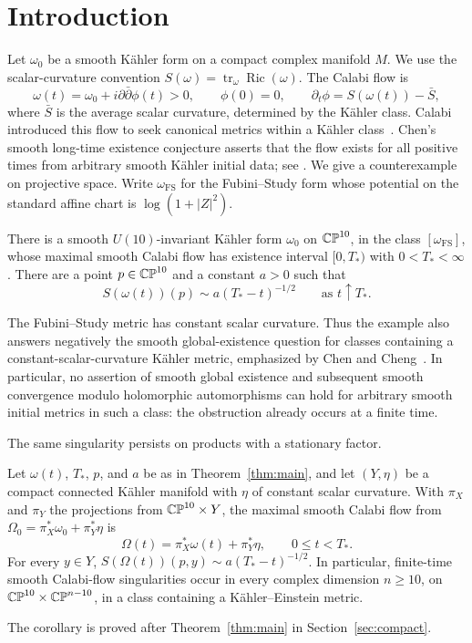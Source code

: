 \section{Introduction}\label{sec:introduction}
Let \(\omega_0\) be a smooth K\"ahler form on a compact complex manifold \(M\).
We use the scalar-curvature convention
\(S(\omega)=\operatorname{tr}_\omega\operatorname{Ric}(\omega)\).
The Calabi flow is
\begin{equation}\label{eq:calabi-flow}
 \omega(t)=\omega_0+i\partial\bar\partial\phi(t)>0,
 \qquad \phi(0)=0,\qquad
 \partial_t\phi=S(\omega(t))-\bar S,
\end{equation}
where \(\bar S\) is the average scalar curvature, determined by the K\"ahler class.
Calabi introduced this flow to seek canonical metrics within a K\"ahler
class~\cite{Calabi1982}. Chen's smooth long-time existence conjecture
asserts that the flow exists for all positive times from arbitrary smooth
K\"ahler initial data; see \cite[Conjecture~1.1]{HeZeng2021}.
We give a counterexample on projective space. Write
\(\omega_{\mathrm{FS}}\) for the Fubini--Study form whose potential
on the standard affine chart is \(\log(1+|Z|^2)\).

\begin{theorem}\label{thm:main}
There is a smooth \(U(10)\)-invariant K\"ahler form \(\omega_0\) on
\(\mathbb{CP}^{10}\), in the class \([\omega_{\mathrm{FS}}]\), whose maximal smooth
Calabi flow has existence interval \([0,T_*)\) with \(0<T_*<\infty\).
There are a point \(p\in\mathbb{CP}^{10}\) and a constant \(a>0\) such that
\[
 S(\omega(t))(p)\sim a(T_*-t)^{-1/2}\qquad\text{as }t\uparrow T_*.
\]
\end{theorem}

The Fubini--Study metric has constant scalar curvature. Thus the example
also answers negatively the smooth global-existence question for classes
containing a constant-scalar-curvature K\"ahler metric, emphasized by
Chen and Cheng~\cite[p.~912, following Conjecture~1.3]{ChenCheng2021}.
In particular, no assertion of smooth global existence and subsequent
smooth convergence modulo holomorphic automorphisms can hold for arbitrary
smooth initial metrics in such a class: the obstruction already occurs
at a finite time.

The same singularity persists on products with a stationary factor.
\begin{corollary}\label{cor:product-singularities}
Let \(\omega(t)\), \(T_*\), \(p\), and \(a\) be as in
Theorem~\ref{thm:main}, and let \((Y,\eta)\) be a compact connected
K\"ahler manifold with \(\eta\) of constant scalar curvature.  With
\(\pi_X\) and \(\pi_Y\) the projections from \(\mathbb{CP}^{10}\times Y\),
the maximal smooth Calabi flow from
\(\Omega_0=\pi_X^*\omega_0+\pi_Y^*\eta\) is
\[
 \Omega(t)=\pi_X^*\omega(t)+\pi_Y^*\eta,
 \qquad 0\leq t<T_*.
\]
For every \(y\in Y\),
\(S(\Omega(t))(p,y)\sim a(T_*-t)^{-1/2}\).
In particular, finite-time smooth Calabi-flow singularities occur in
every complex dimension \(n\geq10\), on
\(\mathbb{CP}^{10}\times\mathbb{CP}^{n-10}\), in a class containing a
K\"ahler--Einstein metric.
\end{corollary}
The corollary is proved after Theorem~\ref{thm:main} in
Section~\ref{sec:compact}.

